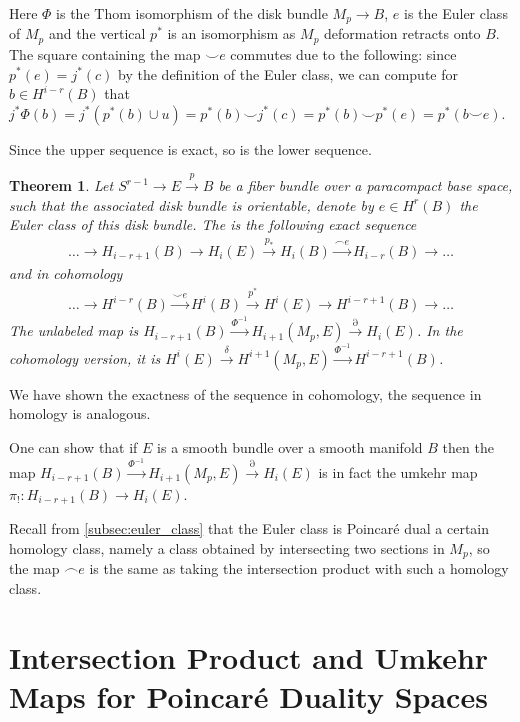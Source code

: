 \documentclass{scrartcl}
\let\emph\relax
\newcommand{\emphi}[1]{\index{#1}\emph{#1}}
\theoremstyle{plain}
\newtheorem{theorem}{Theorem}[section]
\theoremstyle{definition}
\newcommand{\capp}{\mathbin{\frown}}
\newcommand{\cupp}{\mathbin{\smile}}
\begin{document}
Here $\Phi$ is the Thom isomorphism of the disk bundle $M_p\to B$, $e$ is the Euler class of $M_p$ and the vertical $p^*$ is an isomorphism as $M_p$ deformation retracts onto $B$. The square containing the map $\cupp e$ commutes due to the following: since $p^*(e) = j^*(c)$ by the definition of the Euler class, we can compute for $b\in H^{i-r}(B)$ that $j^*\Phi(b) = j^*(p^*(b)\cup u) = p^*(b) \cupp j^*(c) = p^*(b) \cupp p^*(e) = p^*(b\cupp e)$. 

Since the upper sequence is exact, so is the lower sequence.

\begin{theorem}
    Let $S^{r-1} \to E \xrightarrow{p} B$ be a fiber bundle over a paracompact base space, such that the associated disk bundle is orientable, denote by $e\in H^r(B)$ the Euler class of this disk bundle. The \emphi{Gysin sequence} is the following exact sequence
    \begin{align*}
        \dots \to H_{i-r+1}(B) \to H_i(E) \xrightarrow{p_*} H_i(B) \xrightarrow{\capp e} H_{i-r}(B) \to \dots
    \end{align*}
    and in cohomology
    \begin{align*}
        \dots \to H^{i-r}(B) \xrightarrow{\cupp e} H^i(B) \xrightarrow{p^*} H^i(E) \to H^{i-r+1}(B)\to \dots
    \end{align*}
    The unlabeled map is $H_{i-r+1}(B) \xrightarrow{\Phi^{-1}} H_{i+1}(M_p, E) \xrightarrow{\partial} H_i(E)$. In the cohomology version, it is $H^i(E) \xrightarrow{\delta} H^{i+1}(M_p, E) \xrightarrow{\Phi^{-1}} H^{i-r+1}(B)$. 
\end{theorem}

We have shown the exactness of the sequence in cohomology, the sequence in homology is analogous. 

One can show that if $E$ is a smooth bundle over a smooth manifold $B$ then the map $H_{i-r+1}(B) \xrightarrow{\Phi^{-1}} H_{i+1}(M_p, E) \xrightarrow{\partial} H_i(E)$ is in fact the umkehr map $\pi_!\colon H_{i-r+1}(B) \to H_i(E)$. 

Recall from \ref{subsec:euler_class} that the Euler class is Poincaré dual a certain homology class, namely a class obtained by intersecting two sections in $M_p$, so the map $\capp e$ is the same as taking the intersection product with such a homology class. 

\section{Intersection Product and Umkehr Maps for Poincaré Duality Spaces}\label{sec:intersection_product}
\end{document}

